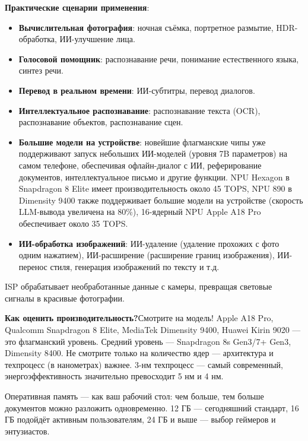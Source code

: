 \textbf{Практические сценарии применения}:

\begin{itemize}
  \item \textbf{Вычислительная фотография}: ночная съёмка, портретное размытие, HDR-обработка, ИИ-улучшение лица.
  \item \textbf{Голосовой помощник}: распознавание речи, понимание естественного языка, синтез речи.
  \item \textbf{Перевод в реальном времени}: ИИ-субтитры, перевод диалогов.
  \item \textbf{Интеллектуальное распознавание}: распознавание текста (OCR), распознавание объектов, распознавание сцен.
  \item \textbf{Большие модели на устройстве}: новейшие флагманские чипы уже поддерживают запуск небольших ИИ-моделей (уровня 7B параметров) на самом телефоне, обеспечивая офлайн-диалог с ИИ, реферирование документов, интеллектуальное письмо и другие функции. NPU Hexagon в Snapdragon 8 Elite имеет производительность около 45 TOPS, NPU 890 в Dimensity 9400 также поддерживает большие модели на устройстве (скорость LLM-вывода увеличена на 80\%), 16-ядерный NPU Apple A18 Pro обеспечивает около 35 TOPS.
  \item \textbf{ИИ-обработка изображений}: ИИ-удаление (удаление прохожих с фото одним нажатием), ИИ-расширение (расширение границ изображения), ИИ-перенос стиля, генерация изображений по тексту и т.д.
\end{itemize}


ISP обрабатывает необработанные данные с камеры, превращая световые сигналы в красивые фотографии.

\textbf{Как оценить производительность?}Смотрите на модель! Apple A18 Pro, Qualcomm Snapdragon 8 Elite, MediaTek Dimensity 9400, Huawei Kirin 9020 — это флагманский уровень. Средний уровень — Snapdragon 8s Gen3/7+ Gen3, Dimensity 8400. Не смотрите только на количество ядер — архитектура и техпроцесс (в нанометрах) важнее. 3-нм техпроцесс — самый современный, энергоэффективность значительно превосходит 5 нм и 4 нм.


Оперативная память — как ваш рабочий стол: чем больше, тем больше документов можно разложить одновременно. 12 ГБ — сегодняшний стандарт, 16 ГБ подойдёт активным пользователям, 24 ГБ и выше — выбор геймеров и энтузиастов.

